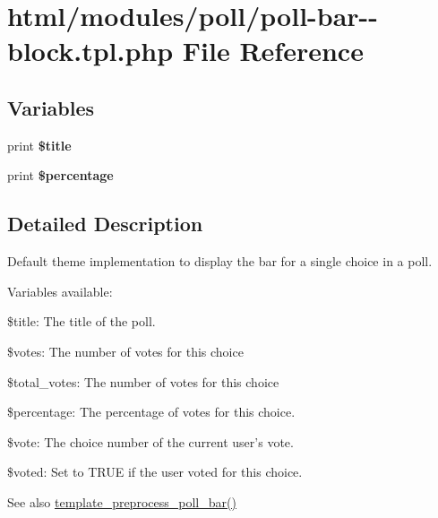 \hypertarget{poll-bar--block_8tpl_8php}{
\section{html/modules/poll/poll-\/bar-\/-\/block.tpl.php File Reference}
\label{poll-bar--block_8tpl_8php}
}
\subsection*{Variables}
\begin{DoxyCompactItemize}
\item 
\hypertarget{poll-bar--block_8tpl_8php_aec2795512d255332f57cacd930a090b4}{
print {\bfseries \$title}}
\label{poll-bar--block_8tpl_8php_aec2795512d255332f57cacd930a090b4}

\item 
\hypertarget{poll-bar--block_8tpl_8php_a271a067b3e16b6916b6d2fb7961ccd85}{
print {\bfseries \$percentage}}
\label{poll-bar--block_8tpl_8php_a271a067b3e16b6916b6d2fb7961ccd85}

\end{DoxyCompactItemize}


\subsection{Detailed Description}
Default theme implementation to display the bar for a single choice in a poll.

Variables available:
\begin{DoxyItemize}
\item \$title: The title of the poll.
\item \$votes: The number of votes for this choice
\item \$total\_\-votes: The number of votes for this choice
\item \$percentage: The percentage of votes for this choice.
\item \$vote: The choice number of the current user's vote.
\item \$voted: Set to TRUE if the user voted for this choice.
\end{DoxyItemize}

\begin{DoxySeeAlso}{See also}
\hyperlink{poll_8module_a65f1b1e0fa803234fe9cde359e79a824}{template\_\-preprocess\_\-poll\_\-bar()} 
\end{DoxySeeAlso}

